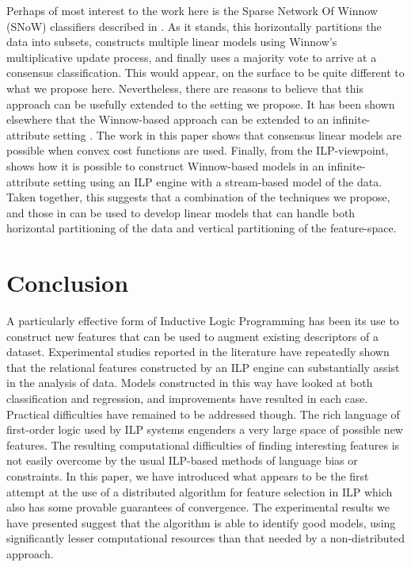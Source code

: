 Perhaps of most interest to the work here is the Sparse
Network Of Winnow (SNoW) classifiers described in \cite{Roth_98,CCRR99}.
As it stands, this horizontally partitions the data into subsets, constructs
multiple linear models using Winnow's multiplicative update process, and
finally uses a majority vote to arrive at a consensus classification. This
would appear, on the surface to be quite different to what we propose here.
Nevertheless, there are reasons to believe that this approach can be usefully
extended to the setting we propose. It has been shown elsewhere that the
Winnow-based approach can be extended to an infinite-attribute setting \cite{Blum1992}. The
work in this paper shows that consensus linear models are possible when
convex cost functions are used. Finally, from the ILP-viewpoint, \cite{ashbain:stream} shows how
it is possible to construct Winnow-based models in an infinite-attribute
setting using an ILP engine with a stream-based model of the data. Taken together,
this suggests that a combination of the techniques we propose, and those in
\cite{CCRR99} can be used to develop linear models that can handle both
horizontal partitioning of the data and vertical partitioning of the feature-space.


\section{Conclusion}
\label{sec:concl}

A particularly effective form of Inductive Logic Programming has been its use
to construct new features that can be used to augment existing descriptors of
a dataset. Experimental studies reported in the literature have repeatedly shown
that the relational features constructed by an ILP engine can substantially assist
in the analysis of data. Models constructed in this way have looked at both classification
and regression, and improvements have resulted in each case. Practical difficulties
have remained to be addressed though. The rich language of first-order logic used
by ILP systems engenders a very large space of possible new features. The resulting
computational difficulties of finding interesting features is not
easily overcome by the usual ILP-based methods of language bias or constraints. In
this paper, we have introduced what appears to be the first attempt at the use
of a distributed algorithm for feature selection in ILP which also has some
provable guarantees of convergence. The experimental results we have presented
suggest that the algorithm is able to identify good models, using significantly lesser
computational resources than that needed by a non-distributed approach.

